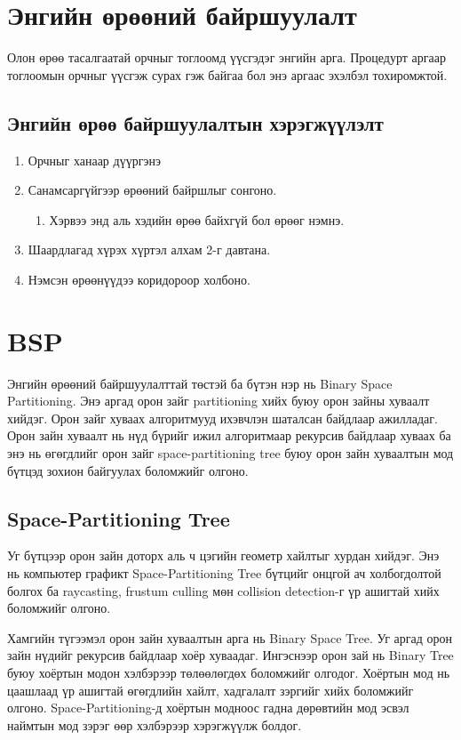 \section{Энгийн өрөөний байршуулалт}
Олон өрөө тасалгаатай орчныг тоглоомд үүсгэдэг энгийн арга. Процедурт аргаар тоглоомын орчныг үүсгэж сурах гэж байгаа бол энэ аргаас эхэлбэл тохиромжтой.

\subsection{Энгийн өрөө байршуулалтын хэрэгжүүлэлт \cite{PMGT}}
\begin{enumerate}
	\item Орчныг ханаар дүүргэнэ
	\item Санамсаргүйгээр өрөөний байршлыг сонгоно.
	      \begin{enumerate}\item
		            Хэрвээ энд аль хэдийн өрөө байхгүй бол өрөөг нэмнэ.
	      \end{enumerate}
	\item Шаардлагад хүрэх хүртэл алхам 2-г давтана.
	\item Нэмсэн өрөөнүүдээ коридороор  холбоно.
\end{enumerate}

\section{BSP}
Энгийн өрөөний байршуулалттай төстэй ба бүтэн нэр нь Binary Space Partitioning. Энэ аргад орон зайг partitioning хийх буюу орон зайны хуваалт хийдэг.  Орон зайг хуваах алгоритмууд ихэвчлэн шаталсан байдлаар ажилладаг. Орон зайн хуваалт нь нүд бүрийг ижил алгоритмаар рекурсив байдлаар хуваах ба энэ нь өгөгдлийг орон зайг space-partitioning tree буюу орон зайн хуваалтын мод бүтцэд зохион байгуулах боломжийг олгоно.

\subsection*{Space-Partitioning Tree}
Уг бүтцээр орон зайн доторх аль ч цэгийн геометр хайлтыг хурдан хийдэг. Энэ нь компьютер графикт Space-Partitioning Tree бүтцийг  онцгой ач холбогдолтой болгох ба raycasting, frustum culling мөн collision detection-г үр ашигтай хийх боломжийг олгоно.

Хамгийн түгээмэл орон зайн хуваалтын арга нь Binary Space Tree. Уг аргад орон зайн нүдийг рекурсив байдлаар хоёр хуваадаг. Ингэснээр орон зай нь Binary Tree буюу хоёртын модон хэлбэрээр төлөөлөгдөх боломжийг олгодог. Хоёртын мод нь цаашлаад үр ашигтай өгөгдлийн хайлт, хадгалалт зэргийг хийх боломжийг олгоно. Space-Partitioning-д хоёртын модноос гадна дөрөвтийн мод эсвэл наймтын мод зэрэг өөр хэлбэрээр хэрэгжүүлж болдог.


